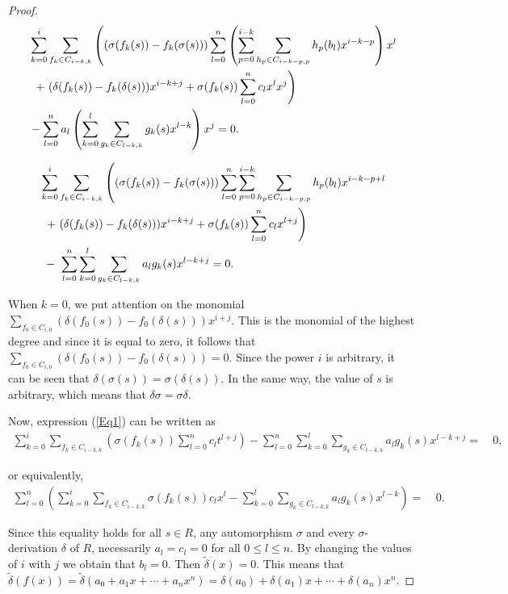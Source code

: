 \documentclass{amsart}
\theoremstyle{definition}
\theoremstyle{remark}
\numberwithin{equation}{section}
\begin{document}
\begin{proof}
\begin{align*}
&\ \sum_{k=0}^{i}\sum_{f_k\in C_{i-k,k}}\left((\sigma(f_k(s))-f_k(\sigma(s)))\sum_{l=0}^{n}\left(\sum_{p=0}^{i-k}\sum_{h_p\in C_{i-k-p,p}}h_p(b_l) x^{i-k-p}\right) x^l \right. \\ \notag
&\ \ \left. + \ (\delta(f_k(s))-f_k(\delta(s))) x^{i-k+j} +\sigma(f_k(s))\sum_{l=0}^{n}c_l x^l x^j\right)\\ \notag
&\ -\sum_{l=0}^{n}a_l\left(\sum_{k=0}^l\sum_{g_k\in C_{l-k,k}}g_k(s) x^{l-k}\right) x^j = 0. 
\end{align*}

\begin{align}\label{Eq1}
&\ \sum_{k=0}^{i}\sum_{f_k\in C_{i-k,k}}\left((\sigma(f_k(s))-f_k(\sigma(s)))\sum_{l=0}^{n}\sum_{p=0}^{i-k}\sum_{h_p\in C_{i-k-p,p}}h_p(b_l)x^{i-k-p+l} \right. \\ \notag
&\ \ \left. + \ (\delta(f_k(s))-f_k(\delta(s)))x^{i-k+j} +\sigma(f_k(s))\sum_{l=0}^{n}c_l x^{l+j}\right)\\ \notag
&\ \ - \ \sum_{l=0}^{n}\sum_{k=0}^l\sum_{g_k\in C_{l-k,k}}a_lg_k(s)x^{l-k+j} = 0. 
\end{align}

When $k=0$, we put attention on the monomial $\sum_{f_0\in C_{i,0}}(\delta(f_0(s))-f_0(\delta(s)))x^{i+j}$. This is the monomial of the highest degree and since it is equal to zero, it follows that $\sum_{f_0\in C_{i,0}} \left(\delta(f_0(s))-f_0(\delta(s))\right) = 0$. Since the power $i$ is arbitrary, it can be seen that $\delta(\sigma(s))=\sigma(\delta(s))$. In the same way, the value of $s$ is arbitrary, which means that $\delta\sigma = \sigma\delta$.

Now, expression {\rm (}\ref{Eq1}{\rm )} can be written as
\begin{align*}
\sum_{k=0}^{i}\sum_{f_k\in C_{i-k,k}}\left(\sigma(f_k(s))\sum_{l=0}^{n}c_lt^{l+j}\right)-\sum_{l=0}^{n}\sum_{k=0}^l\sum_{g_k\in C_{l-k,k}}a_lg_k(s)x^{l-k+j} = &\ 0,
\end{align*}

or equivalently, 
\begin{align*}
\sum_{l=0}^{n}\left(\sum_{k=0}^{i}\sum_{f_k\in C_{i-k,k}}\sigma(f_k(s))c_lx^{l}-\sum_{k=0}^l\sum_{g_k\in C_{l-k,k}}a_lg_k(s)x^{l-k}\right) = &\ 0.
\end{align*}

Since this equality holds for all $s\in R$, any automorphism $\sigma$ and every $\sigma$-derivation $\delta$ of $R$, necessarily $a_l=c_l=0$ for all $0\leq l \leq n$. By changing the values of $i$ with $j$ we obtain that $b_l=0$. Then $\widetilde{\delta}(x)=0$. This means that 
$\widetilde{\delta}(f(x))=\widetilde{\delta}(a_0+a_1x+ \cdots +a_nx^n)=\delta(a_0)+\delta(a_1)x+ \cdots + \delta(a_n)x^n$.
\end{proof}
\end{document}
